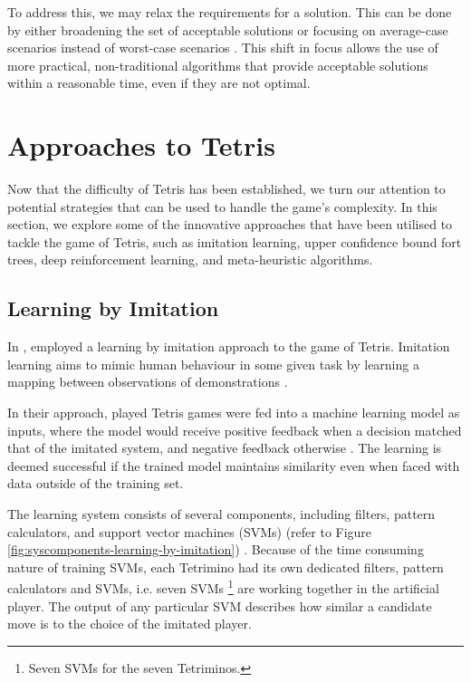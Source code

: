 \documentclass[a4paper, 12pt]{extreport}
\begin{document}
	To address this, we may relax the requirements for a solution. This can be done by either broadening the set of acceptable solutions or focusing on average-case scenarios instead of worst-case scenarios \cite{cc:conceptual-perspective}. This shift in focus allows the use of more practical, non-traditional algorithms that provide acceptable solutions within a reasonable time, even if they are not optimal. 
	
	\section{Approaches to Tetris}
	
	
	Now that the difficulty of Tetris has been established, we turn our attention to potential strategies that can be used to handle the game's complexity. In this section, we explore some of the innovative approaches that have been utilised to tackle the game of Tetris, such as imitation learning, upper confidence bound fort trees, deep reinforcement learning, and meta-heuristic algorithms.
	
	\subsection{Learning by Imitation} \label{subsec:imit-learning}
	
	In \citeyear{tetris-learning-by-imitation}, \citeauthor{tetris-learning-by-imitation} \cite{tetris-learning-by-imitation} employed a learning by imitation approach to the game of Tetris. Imitation learning aims to mimic human behaviour in some given task by learning a mapping between observations of demonstrations \cite{imitation-learning}.
	
	In their approach, played Tetris games were fed into a machine learning model as inputs, where the model would receive positive feedback when a decision matched that of the imitated system, and negative feedback otherwise \cite{tetris-learning-by-imitation}. The learning is deemed successful if the trained model maintains similarity even when faced with data outside of the training set.
	
	The learning system consists of several components, including filters, pattern calculators, and support vector machines (SVMs) (refer to Figure \ref{fig:syscomponents-learning-by-imitation}) \cite{tetris-learning-by-imitation}. Because of the time consuming nature of training SVMs, each Tetrimino had its own dedicated filters, pattern calculators and SVMs, i.e. seven SVMs \footnote{Seven SVMs for the seven Tetriminos.} are working together in the artificial player. The output of any particular SVM describes how similar a candidate move is to the choice of the imitated player.
	
\end{document}
